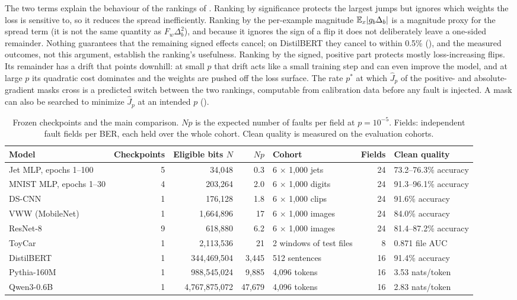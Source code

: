 The two terms explain the behaviour of the rankings of . Ranking by significance protects the largest jumps but ignores which weights the loss is sensitive to, so it reduces the spread inefficiently. Ranking by the per-example magnitude $\mathbb{E}_x|g_b\Delta_b|$ is a magnitude proxy for the spread term (it is not the same quantity as $F_w\Delta_b^2$), and because it ignores the sign of a flip it does not deliberately leave a one-sided remainder. Nothing guarantees that the remaining signed effects cancel; on DistilBERT they cancel to within 0.5\% (), and the measured outcomes, not this argument, establish the ranking's usefulness. Ranking by the signed, positive part protects mostly loss-increasing flips. Its remainder has a drift that points downhill: at small $p$ that drift acts like a small training step and can even improve the model, and at large $p$ its quadratic cost dominates and the weights are pushed off the loss surface. The rate $p^*$ at which $\hat J_p$ of the positive- and absolute-gradient masks cross is a predicted switch between the two rankings, computable from calibration data before any fault is injected. A mask can also be searched to minimize $\hat J_p$ at an intended $p$ ().

\begin{table}[t]
\caption{Frozen checkpoints and the main comparison. $Np$ is the expected number of faults per field at $p=10^{-5}$. Fields: independent fault fields per BER, each held over the whole cohort. Clean quality is measured on the evaluation cohorts.}\label{tab:models}
\centering\small\setlength{\tabcolsep}{4pt}
\begin{tabular}{l r r r l r l}\toprule
Model & Checkpoints & Eligible bits $N$ & $Np$ & Cohort & Fields & Clean quality\\\midrule
Jet MLP, epochs 1--100 & 5 & 34,048 & 0.3 & 6 $\times$ 1,000 jets & 24 & 73.2--76.3\% accuracy\\
MNIST MLP, epochs 1--30 & 4 & 203,264 & 2.0 & 6 $\times$ 1,000 digits & 24 & 91.3--96.1\% accuracy\\
DS-CNN & 1 & 176,128 & 1.8 & 6 $\times$ 1,000 clips & 24 & 91.6\% accuracy\\
VWW (MobileNet) & 1 & 1,664,896 & 17 & 6 $\times$ 1,000 images & 24 & 84.0\% accuracy\\
ResNet-8 & 9 & 618,880 & 6.2 & 6 $\times$ 1,000 images & 24 & 81.4--87.2\% accuracy\\
ToyCar & 1 & 2,113,536 & 21 & 2 windows of test files & 8 & 0.871 file AUC\\
DistilBERT & 1 & 344,469,504 & 3,445 & 512 sentences & 16 & 91.4\% accuracy\\
Pythia-160M & 1 & 988,545,024 & 9,885 & 4,096 tokens & 16 & 3.53 nats/token\\
Qwen3-0.6B & 1 & 4,767,875,072 & 47,679 & 4,096 tokens & 16 & 2.83 nats/token\\\bottomrule
\end{tabular}
\end{table}

